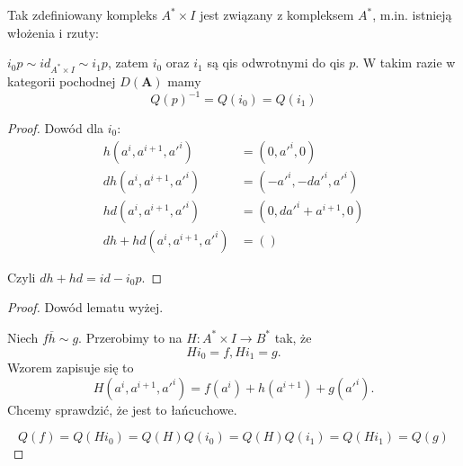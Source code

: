 Tak zdefiniowany kompleks $A^*\times I$ jest związany z kompleksem $A^*$, m.in. istnieją włożenia i rzuty:
\begin{center}\end{center}

\begin{lemma}
  $i_0p\sim id_{A^*\times I}\sim i_1p$, zatem $i_0$ oraz $i_1$ są qis odwrotnymi do qis $p$. W takim razie w kategorii pochodnej $D(\mathbf{A})$ mamy 
  $$Q(p)^{-1}=Q(i_0)=Q(i_1)$$
\end{lemma}

\begin{proof}
  Dowód dla $i_0$:
  \begin{align*}
    h(a^i, a^{i+1}, a'^i)&=(0, a'^i, 0)\\ 
    dh(a^i, a^{i+1}, a'^i) &= (-a'^i, -da'^i, a'^i)\\ 
    hd(a^i, a^{i+1}, a'^i) &= (0, da'^i+ a^{i+1}, 0)\\ 
    dh+hd (a^i, a^{i+1}, a'^i)&=()
  \end{align*}

\begin{center}\end{center}
Czyli $dh+hd=id-i_0p$.

\end{proof}

\begin{proof}
  Dowód lematu wyżej.

  Niech $f\overline{h}{\sim} g$. Przerobimy to na $H:A^*\times I\to B^*$ tak, że 
  $$Hi_0=f, Hi_1=g.$$
  Wzorem zapisuje się to 
  $$H(a^i, a^{i+1}, a'^i)=f(a^i)+h(a^{i+1})+g(a'^i).$$
  Chcemy sprawdzić, że jest to łańcuchowe. 
  \begin{center}\end{center}
  $$Q(f)=Q(Hi_0)=Q(H)Q(i_0)=Q(H)Q(i_1)=Q(Hi_1)=Q(g)$$
\end{proof}


